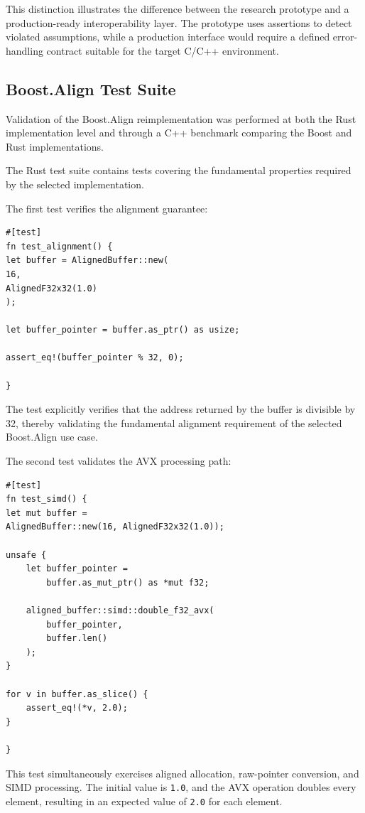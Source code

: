 This distinction illustrates the difference between the research prototype and a production-ready interoperability layer.
The prototype uses assertions to detect violated assumptions, while a production interface would require a defined 
error-handling contract suitable for the target C/C++ environment.

\subsection{Boost.Align Test Suite}

Validation of the Boost.Align reimplementation was performed at both the Rust implementation level and through a 
C++ benchmark comparing the Boost and Rust implementations.

The Rust test suite contains tests covering the fundamental properties required by the selected implementation.

The first test verifies the alignment guarantee:

\begin{lstlisting}[style=rustblock]
#[test]
fn test_alignment() {
let buffer = AlignedBuffer::new(
16,
AlignedF32x32(1.0)
);

let buffer_pointer = buffer.as_ptr() as usize;

assert_eq!(buffer_pointer % 32, 0);

}
\end{lstlisting}

The test explicitly verifies that the address returned by the buffer is divisible by 32, thereby validating the 
fundamental alignment requirement of the selected Boost.Align use case.

The second test validates the AVX processing path:

\begin{lstlisting}[style=rustblock]
#[test]
fn test_simd() {
let mut buffer =
AlignedBuffer::new(16, AlignedF32x32(1.0));

unsafe {
    let buffer_pointer =
        buffer.as_mut_ptr() as *mut f32;

    aligned_buffer::simd::double_f32_avx(
        buffer_pointer,
        buffer.len()
    );
}

for v in buffer.as_slice() {
    assert_eq!(*v, 2.0);
}

}
\end{lstlisting}

This test simultaneously exercises aligned allocation, raw-pointer conversion, and SIMD processing. 
The initial value is \lstinline|1.0|, and the AVX operation doubles every element, resulting in an expected
value of \lstinline|2.0| for each element.

